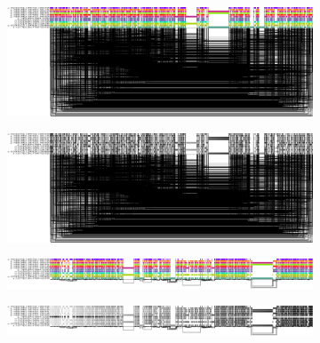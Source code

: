 \begin{figure}[!htb]
	\centering
	\begin{subfigure}[t]{0.4\textwidth}
		\centering
		\caption{}
		\includegraphics[width=\linewidth]{fig/latent_graph_structure/DRB1-3123.fa.gz.c666522.417fcdf.seqwish.og.r.og.png}
		\label{fig:random}
	\end{subfigure}
	\begin{subfigure}[t]{0.4\textwidth}
		\centering
		\caption{}
		\includegraphics[width=\linewidth]{fig/latent_graph_structure/DRB1-3123.fa.gz.c666522.417fcdf.seqwish.og.r.og.ud.png}
		\label{fig:random_pos}
	\end{subfigure}
	\begin{subfigure}[t]{0.4\textwidth}
		\centering
		\caption{}
		\includegraphics[width=\linewidth]{fig/latent_graph_structure/DRB1-3123.fa.gz.c666522.417fcdf.seqwish.og.Y.og.png}
		\label{fig:sorted}
	\end{subfigure}
	\begin{subfigure}[t]{0.4\textwidth}
		\centering
		\caption{}
		\includegraphics[width=\linewidth]{fig/latent_graph_structure/DRB1-3123.fa.gz.c666522.417fcdf.seqwish.og.Y.og.ud.png}
		\label{fig:sorted_pos}

\end{subfigure}
\end{figure}
